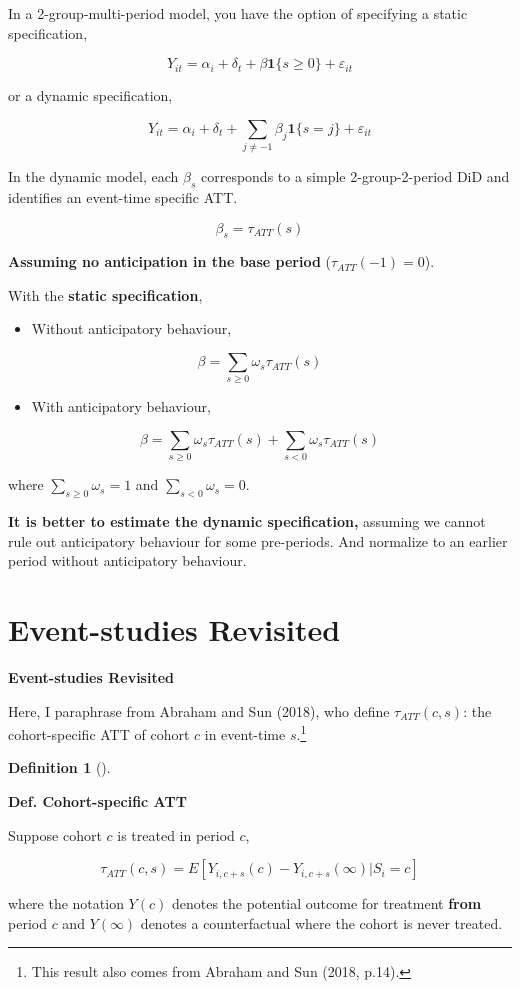 \documentclass[
  letterpaper,
  DIV=11,
  numbers=noendperiod]{scrreprt}
\providecommand{\tightlist}{%
  \setlength{\itemsep}{0pt}\setlength{\parskip}{0pt}}\usepackage{longtable,booktabs,array}
\theoremstyle{definition}
\newtheorem{definition}{Definition}[chapter]
\theoremstyle{remark}
\begin{document}
In a 2-group-multi-period model, you have the option of specifying a
static specification,

\[
Y_{it} = \alpha_i + \delta_t + \beta \mathbf{1}\{s\geq 0\} + \varepsilon_{it}
\]

or a dynamic specification,

\[
Y_{it} = \alpha_i + \delta_t + \sum_{j\neq-1}\beta_j \mathbf{1}\{s=j\} + \varepsilon_{it}
\]

In the dynamic model, each \(\beta_s\) corresponds to a simple
2-group-2-period DiD and identifies an event-time specific ATT.

\[
\beta_s = \tau_{ATT}(s)
\]

\textbf{Assuming no anticipation in the base period}
(\(\tau_{ATT}(-1)=0\)).

With the \textbf{static specification},

\begin{itemize}
\tightlist
\item
  Without anticipatory behaviour,
\end{itemize}

\[
\beta = \sum_{s\geq 0}\omega_s \tau_{ATT}(s)
\]

\begin{itemize}
\tightlist
\item
  With anticipatory behaviour,
\end{itemize}

\[
\beta = \sum_{s\geq 0}\omega_s \tau_{ATT}(s) + \sum_{s< 0}\omega_s \tau_{ATT}(s)
\]

where \(\sum_{s\geq 0}\omega_s = 1\) and \(\sum_{s< 0}\omega_s = 0\).

\textbf{It is better to estimate the dynamic specification,} assuming we
cannot rule out anticipatory behaviour for some pre-periods. And
normalize to an earlier period without anticipatory behaviour.

\section{Event-studies Revisited}\label{event-studies-revisited}

\textbf{Event-studies Revisited}

Here, I paraphrase from Abraham and Sun (2018), who define
\(\tau_{ATT}(c,s)\): the cohort-specific ATT of cohort \(c\) in
event-time \(s\).\footnote{This result also comes from Abraham and Sun
  (2018, p.14).}

\begin{definition}[]\protect\hypertarget{def-cohort-specific-att}{}\label{def-cohort-specific-att}

\textbf{Def. Cohort-specific ATT}

Suppose cohort \(c\) is treated in period \(c\),

\[
\tau_{ATT}(c,s) = E[Y_{i,c+s}(c)-Y_{i,c+s}(\infty)|S_i=c]
\]

where the notation \(Y(c)\) denotes the potential outcome for treatment
\textbf{from} period \(c\) and \(Y(\infty)\) denotes a counterfactual
where the cohort is never treated.

\end{definition}
\end{document}
